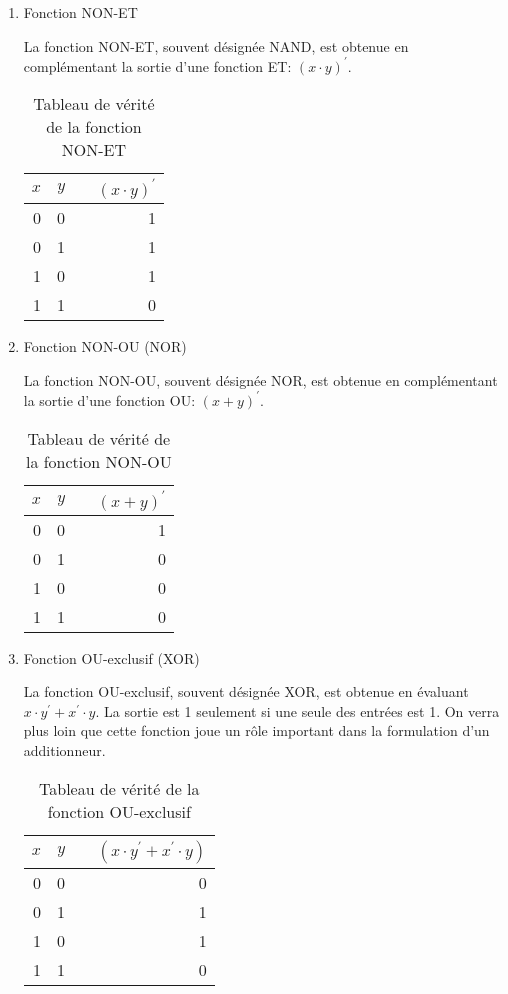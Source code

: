 \documentclass[11pt]{article}
\begin{document}
\begin{enumerate}
\item Fonction NON-ET
\label{sec:org4a342f6}

La fonction NON-ET, souvent désignée NAND, est obtenue en
complémentant la sortie d'une fonction ET: \((x \cdot y)^\prime\).

\begin{table}[htbp]
\caption{\label{tab:org529398c}Tableau de vérité de la fonction NON-ET}
\centering
\begin{tabular}{rrlr}
\(x\) & \(y\) &  & \((x \cdot y)^\prime\)\\
\hline
0 & 0 &  & 1\\
0 & 1 &  & 1\\
1 & 0 &  & 1\\
1 & 1 &  & 0\\
\end{tabular}
\end{table}

\item Fonction NON-OU (NOR)
\label{sec:org846c547}

La fonction NON-OU, souvent désignée NOR, est obtenue en complémentant
la sortie d'une fonction OU: \((x + y)^\prime\).

\begin{table}[htbp]
\caption{\label{tab:orge6a1eb5}Tableau de vérité de la fonction NON-OU}
\centering
\begin{tabular}{rrlr}
\(x\) & \(y\) &  & \((x + y)^\prime\)\\
\hline
0 & 0 &  & 1\\
0 & 1 &  & 0\\
1 & 0 &  & 0\\
1 & 1 &  & 0\\
\end{tabular}
\end{table}

\item Fonction OU-exclusif (XOR)
\label{sec:org7a88ac6}

La fonction OU-exclusif, souvent désignée XOR, est obtenue en évaluant
\(x \cdot y^\prime + x^\prime \cdot y\). La sortie est 1 seulement si
une seule des entrées est 1. On verra plus loin que cette fonction
joue un rôle important dans la formulation d'un additionneur.

\begin{table}[htbp]
\caption{\label{tab:orgfbad7dd}Tableau de vérité de la fonction OU-exclusif}
\centering
\begin{tabular}{rrlr}
\(x\) & \(y\) &  & \((x \cdot y^\prime + x^\prime \cdot y)\)\\
\hline
0 & 0 &  & 0\\
0 & 1 &  & 1\\
1 & 0 &  & 1\\
1 & 1 &  & 0\\
\end{tabular}
\end{table}
\end{enumerate}
\end{document}
